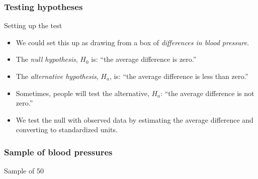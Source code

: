 \documentclass[handout]{beamer}
\begin{document}

   \begin{frame} \frametitle{Testing hypotheses}

   \begin{block}
   {Setting up the test}
   \begin{itemize}

   \item We could set this up as drawing from a box of {\em differences
   in blood pressure}.

   \item The {\em null hypothesis}, $H_0$ is: ``the average difference is zero.''

   \item The {\em alternative hypothesis}, $H_a$, is: ``the average difference is less than zero.''

   \item Sometimes, people will test the alternative, $H_a$: ``the
   average difference is not zero.''

   \item We test the null with observed data by estimating
    the average difference and converting to standardized units.
   \end{itemize}
   \end{block}
   \end{frame}



   \begin{frame}
   \frametitle{Sample of blood pressures}
   \begin{center}
   \end{center}
   Sample of 50
   \end{frame}

\end{document}
